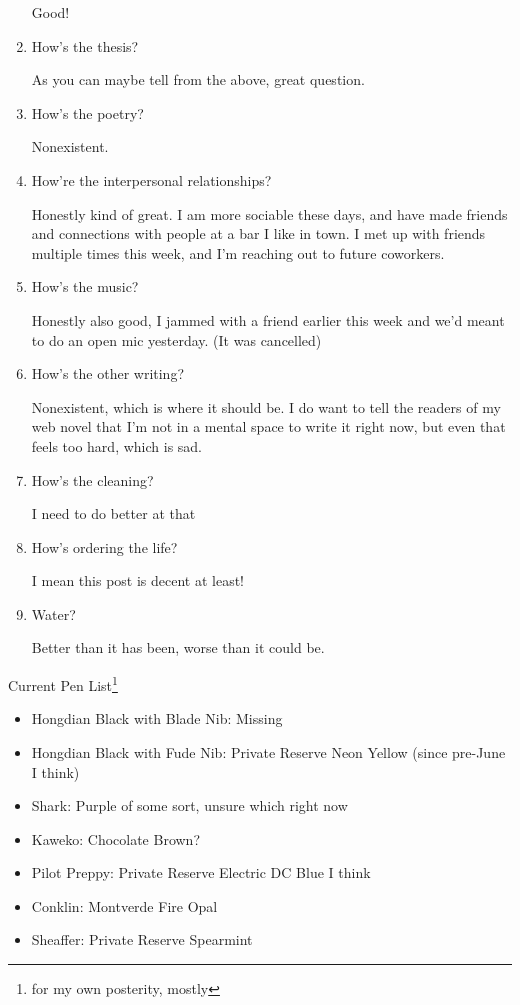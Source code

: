 \documentclass[12pt]{article}
\renewcommand{\,}{\textsuperscript{,}}
\begin{document}
\begin{enumerate}
Good!

\item How's the thesis?

As you can maybe tell from the above, great question.

\item How's the poetry?

Nonexistent.

\item How're the interpersonal relationships?

Honestly kind of great.  
I am more sociable these days, and have made friends and connections with people at a bar I like in town.  
I met up with friends multiple times this week, and I'm reaching out to future coworkers.

\item How's the music?

Honestly also good, I jammed with a friend earlier this week and we'd meant to do an open mic yesterday. (It was cancelled)

\item How's the other writing?

Nonexistent, which is where it should be. I do want to tell the readers of my web novel that I'm not in a mental space to write it right now, but even that feels too hard, which is sad.

\item How's the cleaning?

I need to do better at that

\item How's ordering the life?

I mean this post is decent at least!

\item Water?

Better than it has been, worse than it could be.

\end{enumerate}

Current Pen List\footnote{for my own posterity, mostly}

\begin{itemize}

\item Hongdian Black with Blade Nib: Missing  
\item Hongdian Black with Fude Nib: Private Reserve Neon Yellow (since pre-June I think)  
\item Shark: Purple of some sort, unsure which right now  
\item Kaweko: Chocolate Brown?  
\item Pilot Preppy: Private Reserve Electric DC Blue I think  
\item Conklin: Montverde Fire Opal  
\item Sheaffer: Private Reserve Spearmint

\end{itemize}
\end{document}
